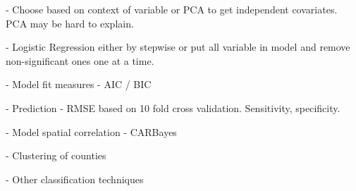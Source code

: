 \documentclass[
12pt, 
english, 
oneside,
doublespacing, %
nolistspacing, %
headsepline, %
]{../Thesis} %
\begin{document}
- Choose based on context of variable or PCA to get independent covariates. PCA may be hard to explain.


- Logistic Regression either by stepwise or put all variable in model and remove non-significant ones one at a time.


- Model fit measures - AIC / BIC\par
- Prediction - RMSE based on 10 fold cross validation. Sensitivity, specificity.


- Model spatial correlation - CARBayes\par
- Clustering of counties\par
- Other classification techniques



\end{document}
